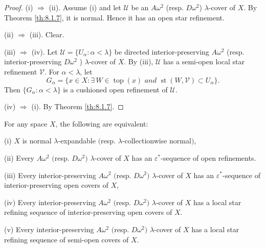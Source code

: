 \documentclass[main.tex]{subfiles}
\begin{document}
\begin{proof} 
(i) $\Rightarrow$ (ii).  Assume (i) and let $\mathscr{U}$ be an $A\omega^2$ 
(resp. $D\omega^2$) $\lambda$-cover of $X$. By Theorem \ref{th:8.1.7}, it is normal.
Hence it has an open star refinement.

(ii) $\Rightarrow$ (iii). Clear.

(iii) $\Rightarrow$ (iv). Let $\mathscr{U}=\{U_\alpha: \alpha < \lambda\}$ be 
directed  
interior-preserving  $A\omega^2$ (resp. interior-preserving $D\omega^2$ )
$\lambda$-cover of $X$. By (iii), $\mathscr{U}$ has a semi-open local star refinement
$\mathscr{V}$. For $\alpha < \lambda$, let 
$$G_\alpha = \{x\in X: \exists \, W\in \operatorname{top}(x)
 \textit{ and } \operatorname{st}(W, \mathscr{V})\subset U_\alpha\}.$$
 Then $\{G_\alpha:\alpha < \lambda\}$ is a cushioned open refinement of 
 $\mathscr{U}$.
 
 (iv) $\Rightarrow$ (i). By Theorem \ref{th:8.1.7}.
\end{proof}


{\theorem{} \label{th:8.1.9}
For any space $X$, the following are equivalent:

\textup{(i)} $X$ is normal $\lambda$-expandable $($resp. $\lambda$-collectionwise normal$)$,

\textup{(ii)}  Every $A\omega^2$ $($resp. $D\omega^2)$  $\lambda$-cover of $X$ has an $\varepsilon^*$-sequence of open refinements.

\textup{(iii)}  Every interior-preserving $A\omega^2$ $($resp. $D\omega^2)$  $\lambda$-cover of $X$ has an $\varepsilon^*$-sequence 
of interior-preserving open covers of $X$,

\textup{(iv)}  Every interior-preserving $A\omega^2$ $($resp. $D\omega^2)$  $\lambda$-cover of $X$ has a local star refining sequence of interior-preserving 
open covers of $X$.

\textup{(v)} Every interior-preserving $A\omega^2$ $($resp. $D\omega^2)$  $\lambda$-cover of $X$ has a local star refining sequence of semi-open covers of $X$.
}
\end{document}
